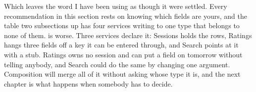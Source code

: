 %
Which leaves the word I have been using as though it were settled. Every
recommendation in this section rests on knowing which fields are yours, and
the table two subsections up has four services writing to one 
type that belongs to none of them.  is worse. Three services
declare it: Sessions holds the rows, Ratings hangs three fields off a key it
can be entered through, and Search points at it with a stub. Ratings owns no
session and can put a field on  tomorrow without telling
anybody, and Search could do the same by changing one argument. Composition
will merge all of it without asking whose type it is, and the next chapter is
what happens when somebody has to decide.
%
